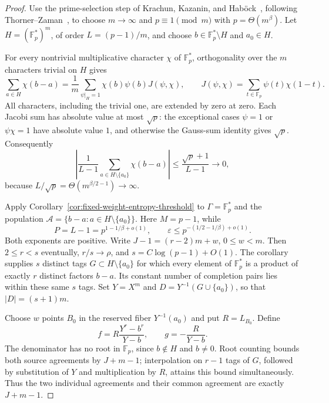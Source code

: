 \begin{proof}
Use the prime-selection step of Krachun, Kazanin, and
Hab\"ock~\cite[Theorem~1 and Appendix~A]{kkh}, following
Thorner--Zaman~\cite[Corollary~3.1 and (3.2)]{thorner-zaman2021}, to choose
$m\to\infty$ and $p\equiv1\pmod m$ with $p=\Theta(m^\beta)$.
Let $H=(\mathbb F_p^*)^m$, of order $L=(p-1)/m$, and choose
$b\in\mathbb F_p^*\setminus H$ and $a_0\in H$.

For every nontrivial multiplicative character $\chi$ of
$\mathbb F_p^*$, orthogonality over the $m$ characters trivial on $H$
gives
\[
 \sum_{a\in H}\chi(b-a)
 =\frac1m\sum_{\psi|_H=1}
   \chi(b)\psi(b)J(\psi,\chi),
 \qquad
 J(\psi,\chi)=\sum_{t\in\mathbb F_p}\psi(t)\chi(1-t).
\]
All characters, including the trivial one, are extended by zero at zero.
Each Jacobi sum has absolute value at most $\sqrt p$: the exceptional
cases $\psi=1$ or $\psi\chi=1$ have absolute value $1$, and otherwise
the Gauss-sum identity gives $\sqrt p$.
Consequently
\[
 \left|\frac1{L-1}\sum_{a\in H\setminus\{a_0\}}\chi(b-a)\right|
 \le\frac{\sqrt p+1}{L-1}\longrightarrow0,
\]
because $L/\sqrt p=\Theta(m^{\beta/2-1})\to\infty$.

Apply Corollary~\ref{cor:fixed-weight-entropy-threshold} to
$\Gamma=\mathbb F_p^*$ and the population
$\mathcal A=\{b-a:a\in H\setminus\{a_0\}\}$.
Here $M=p-1$, while
\[
 P=L-1=p^{1-1/\beta+o(1)},\qquad
 \varepsilon\le p^{-(1/2-1/\beta)+o(1)}.
\]
Both exponents are positive.  Write
$J-1=(r-2)m+w$, $0\le w<m$.  Then $2\le r<s$ eventually,
$r/s\to\rho$, and $s=C\log(p-1)+O(1)$.
The corollary supplies $s$ distinct tags
$G\subset H\setminus\{a_0\}$ for which every element of
$\mathbb F_p^*$ is a product of exactly $r$ distinct factors $b-a$.
Its constant number of completion pairs lies within these same $s$
tags.  Set $Y=X^m$ and $D=Y^{-1}(G\cup\{a_0\})$, so that
$|D|=(s+1)m$.

Choose $w$ points $B_0$ in the reserved fiber $Y^{-1}(a_0)$ and put
$R=L_{B_0}$.  Define
\[
 f=R\frac{Y^r-b^r}{Y-b},\qquad g=-\frac R{Y-b}.
\]
The denominator has no root in $\mathbb F_p$, since $b\notin H$
and $b\ne0$.  Root counting bounds both source agreements by
$J+m-1$; interpolation on $r-1$ tags of $G$, followed by substitution
of $Y$ and multiplication by $R$, attains this bound simultaneously.
Thus the two individual agreements and their common agreement are
exactly $J+m-1$.


\end{proof}
